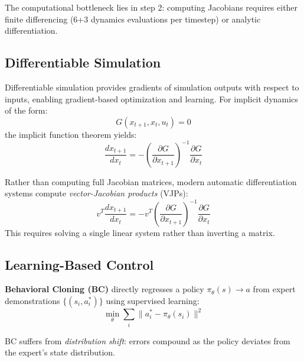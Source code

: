 \documentclass[conference]{IEEEtran}
\begin{document}
The computational bottleneck lies in step 2: computing Jacobians requires either finite differencing (6+3 dynamics evaluations per timestep) or analytic differentiation.

\subsection{Differentiable Simulation}

Differentiable simulation provides gradients of simulation outputs with respect to inputs, enabling gradient-based optimization and learning. For implicit dynamics of the form:
\begin{equation}
G(x_{t+1}, x_t, u_t) = 0
\end{equation}
the implicit function theorem yields:
\begin{equation}
\frac{dx_{t+1}}{dx_t} = -\left(\frac{\partial G}{\partial x_{t+1}}\right)^{-1} \frac{\partial G}{\partial x_t}
\end{equation}

Rather than computing full Jacobian matrices, modern automatic differentiation systems compute \emph{vector-Jacobian products} (VJPs):
\begin{equation}
v^T \frac{dx_{t+1}}{dx_t} = -v^T \left(\frac{\partial G}{\partial x_{t+1}}\right)^{-1} \frac{\partial G}{\partial x_t}
\end{equation}
This requires solving a single linear system rather than inverting a matrix.

\subsection{Learning-Based Control}

\textbf{Behavioral Cloning (BC)} directly regresses a policy $\pi_\theta(s) \rightarrow a$ from expert demonstrations $\{(s_i, a_i^*)\}$ using supervised learning:
\begin{equation}
\min_\theta \sum_i \|a_i^* - \pi_\theta(s_i)\|^2
\end{equation}

BC suffers from \emph{distribution shift}: errors compound as the policy deviates from the expert's state distribution.
\end{document}

